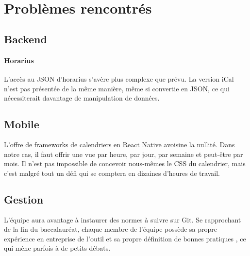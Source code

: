 \section{Problèmes rencontrés}
	\subsection{Backend}
	\paragraph{Horarius} L'accès au JSON d'horarius s'avère plus complexe que prévu. La version iCal n'est pas présentée de la même manière, même si convertie en JSON, ce qui nécessiterait davantage de manipulation de données.
	
	\subsection{Mobile}
	L'offre de frameworks de calendriers en React Native avoisine la nullité. Dans notre cas, il faut offrir une vue par heure, par jour, par semaine et peut-être par mois. Il n'est pas impossible de concevoir nous-mêmes le CSS du calendrier, mais c'est malgré tout un défi qui se comptera en dizaines d'heures de travail.
	
	\subsection{Gestion}
	L'équipe aura avantage à instaurer des normes à suivre sur Git. Se rapprochant de la fin du baccalauréat, chaque membre de l'équipe possède sa propre expérience en entreprise de l'outil et sa propre définition de \og bonnes pratiques \fg, ce qui mène parfois à de petits débats.